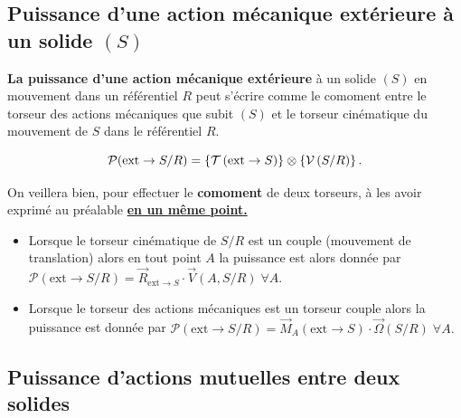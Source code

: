 \documentclass[10pt,fleqn]{article} %
\begin{document}
\subsection{Puissance d'une action mécanique extérieure à un solide $(S)$}
\begin{defi}
\textbf{La puissance d'une action mécanique extérieure} à un solide $(S)$ en mouvement dans un référentiel $R$ peut s'écrire comme le comoment entre le torseur des actions mécaniques que subit $(S)$ et le torseur cinématique du mouvement de $S$ dans le référentiel $R$.

$$
\mathcal{P}(\text{ext} \rightarrow S/R)=\left\{\mathcal{T} \left(\text{ext}\rightarrow S \right) \right\}\otimes \left\{\mathcal{V} \left(S/R \right) \right\}.
$$
\end{defi}



\begin{warn}
On veillera bien, pour effectuer le \textbf{comoment} de deux torseurs, à les avoir exprimé au préalable \underline{\textbf{en un même point.}}
\end{warn}

\begin{rem}%
\begin{itemize}
\item Lorsque le torseur cinématique de $S/R$ est un couple (mouvement de translation) alors en tout point $A$ la puissance est alors donnée par
$
\mathcal{P}(\text{ext} \rightarrow S/R)=\overrightarrow{R}_{\text{ext}\rightarrow S}\cdot \overrightarrow{V}(A,S/R) \;
\forall A.
$

\item Lorsque le torseur des actions mécaniques est un torseur couple alors la puissance est donnée par
$
\mathcal{P}(\text{ext} \rightarrow S/R)=\overrightarrow{M}_A(\text{ext}\rightarrow S)\cdot \overrightarrow{\Omega}(S/R)\;
\forall A.
$

\end{itemize}
\end{rem}%




\subsection{Puissance d'actions mutuelles entre deux solides}
\end{document}
